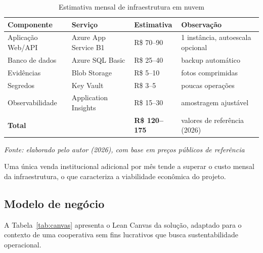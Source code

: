 \begin{table}[H]
  \centering
  \caption{Estimativa mensal de infraestrutura em nuvem}
  \label{tab:custos}
  \fontsize{10}{12}\selectfont
  \begin{tabular}{L{4.6cm}L{3.6cm}L{2.6cm}L{3.6cm}}
    \toprule
    \textbf{Componente} & \textbf{Serviço} & \textbf{Estimativa} & \textbf{Observação} \\
    \midrule
    Aplicação Web/API & Azure App Service B1 & R\$ 70--90 & 1 instância, autoescala
      opcional \\
    Banco de dados & Azure SQL Basic & R\$ 25--40 & backup automático \\
    Evidências & Blob Storage & R\$ 5--10 & fotos comprimidas \\
    Segredos & Key Vault & R\$ 3--5 & poucas operações \\
    Observabilidade & Application Insights & R\$ 15--30 & amostragem ajustável \\
    \midrule
    \textbf{Total} & & \textbf{R\$ 120--175} & valores de referência (2026) \\
    \bottomrule
  \end{tabular}

  \vspace{2pt}
  {\fontsize{10}{12}\selectfont\itshape Fonte: elaborado pelo autor (2026), com
  base em preços públicos de referência}
\end{table}

Uma única venda institucional adicional por mês tende a superar o custo mensal
da infraestrutura, o que caracteriza a viabilidade econômica do projeto.

\subsection{Modelo de negócio}

A Tabela~\ref{tab:canvas} apresenta o Lean Canvas da solução, adaptado para o
contexto de uma cooperativa sem fins lucrativos que busca sustentabilidade
operacional.

